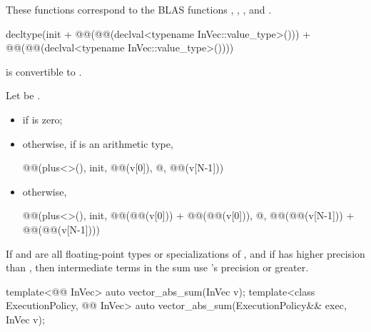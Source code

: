 \begin{itemdescr}
\pnum
\begin{note}
These functions correspond to the BLAS functions
, , , and \supercite{blas1}.
\end{note}

\pnum
\mandates
\begin{codeblock}
decltype(init + @@(@@(declval<typename InVec::value_type>())) +
                @@(@@(declval<typename InVec::value_type>())))
\end{codeblock}
is convertible to .

\pnum
\returns
Let  be .
\begin{itemize}
\item
{} if  is zero;
\item
otherwise, if  is an arithmetic type,
\begin{codeblock}
@@(plus<>(), init, @@(v[0]), @\ldots@, @@(v[N-1]))
\end{codeblock}
\item
otherwise,
\begin{codeblock}
@@(plus<>(), init,
       @@(@@(v[0])) + @@(@@(v[0])),
       @\ldots@,
       @@(@@(v[N-1])) + @@(@@(v[N-1])))
\end{codeblock}
\end{itemize}

\pnum
\remarks
If  and 
are all floating-point types or specializations of ,
and if  has higher precision
than ,
then intermediate terms in the sum use 's precision or greater.
\end{itemdescr}

%
\begin{itemdecl}
template<@@ InVec>
  auto vector_abs_sum(InVec v);
template<class ExecutionPolicy, @@ InVec>
  auto vector_abs_sum(ExecutionPolicy&& exec, InVec v);
\end{itemdecl}

